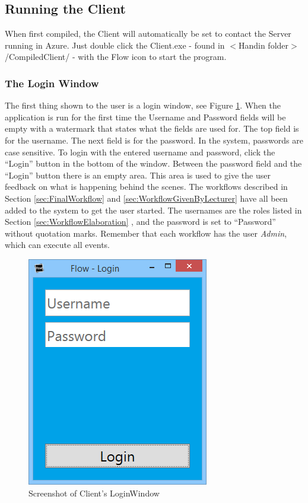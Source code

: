 \subsection{Running the Client}
When first compiled, the Client will automatically be set to contact the Server running in Azure. Just double click the Client.exe - found in $<$Handin folder$>$/CompiledClient/ -  with the Flow icon to start the program.

\subsubsection{The Login Window}
The first thing shown to the user is a login window, see Figure \ref{fig:LoginWindow}. When the application is run for the first time the Username and Password fields will be empty with a watermark that states what the fields are used for. \newline
The top field is for the username. The next field is for the password. In the system, passwords are case sensitive. \newline
To login with the entered username and password, click the “Login” button in the bottom of the window. \newline
Between the password field and the “Login” button there is an empty area. This area is used to give the user feedback on what is happening behind the scenes. \newline
The workflows described in Section \ref{sec:FinalWorkflow}  and \ref{sec:WorkflowGivenByLecturer}  have all been added to the system to get the user started. The usernames are the roles listed in Section \ref{sec:WorkflowElaboration} , and the password is set to “Password” without quotation marks. Remember that each workflow has the user \textit{Admin}, which can execute all events.

\begin{figure}
\centering
\includegraphics[width=0.5\linewidth]{Figures/LoginWindow}
\caption{\label{fig:LoginWindow} Screenshot of Client's LoginWindow}
\end{figure}


